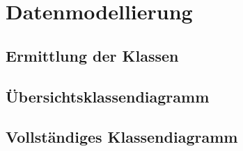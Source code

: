 \section{Datenmodellierung}
\subsection{Ermittlung der Klassen}
\subsection{Übersichtsklassendiagramm}
\subsection{Vollständiges Klassendiagramm}












